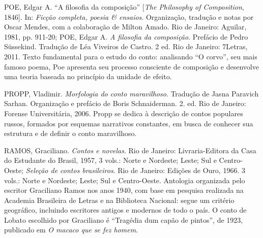 \documentclass[12pt]{extarticle}
\begin{document}
POE, Edgar A. ``A filosofia da composição'' {[}\emph{The Philosophy of
Composition}, 1846{]}. In: \emph{Ficção completa, poesia \& ensaios}.
Organização, tradução e notas por Oscar Mendes, com a colaboração de
Milton Amado. Rio de Janeiro: Aguilar, 1981, pp. 911-20; POE, Edgar A.
\emph{A filosofia da composição}. Prefácio de Pedro Süssekind. Tradução
de Léa Viveiros de Castro. 2 ed. Rio de Janeiro: 7Letras, 2011. Texto
fundamental para o estudo do conto: analisando ``O corvo'', seu mais
famoso poema, Poe apresenta seu processo consciente de composição e
desenvolve uma teoria baseada no princípio da unidade de efeito.

PROPP, Vladimir. \emph{Morfologia do conto maravilhoso}. Tradução de
Jasna Paravich Sarhan. Organização e prefácio de Boris Schnaiderman. 2.
ed. Rio de Janeiro: Forense Universitária, 2006. Propp se dedica à
descrição de contos populares russos, formados por esquemas narrativos
constantes, em busca de conhecer sua estrutura e de definir o conto
maravilhoso.

RAMOS, Graciliano. \emph{Contos e novelas}. Rio de Janeiro:
Livraria-Editora da Casa do Estudante do Brasil, 1957, 3 vols.: Norte e
Nordeste; Leste; Sul e Centro-Oeste; \emph{Seleção de contos
brasileiros}. Rio de Janeiro: Edições de Ouro, 1966. 3 vols.: Norte e
Nordeste; Leste; Sul e Centro-Oeste. Antologia organizada pelo escritor
Graciliano Ramos nos anos 1940, com base em pesquisa realizada na
Academia Brasileira de Letras e na Biblioteca Nacional: segue um
critério geográfico, incluindo escritores antigos e modernos de todo o
país. O conto de Lobato escolhido por Graciliano é ``Tragédia dum capão
de pintos'', de 1923, publicado em \emph{O macaco que se fez homem}.
\end{document}
